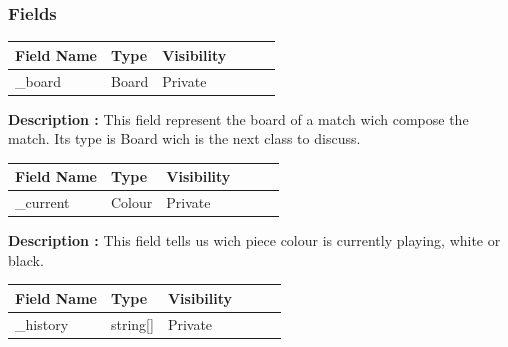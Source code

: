 \documentclass[12pt]{article}
\begin{document}
\subsubsection{Fields}

\begin{table}[H]
    \begin{tabular}{llllll}
    \hline
    \multicolumn{1}{|l|}{\cellcolor[HTML]{EFEFEF}\textbf{Field Name}} & \multicolumn{1}{l|}{\cellcolor[HTML]{EFEFEF}\textbf{Type}} & \multicolumn{1}{l|}{\cellcolor[HTML]{EFEFEF}\textbf{Visibility}} \\ \hline
    \multicolumn{1}{|l|}{\_board}                                     & \multicolumn{1}{l|}{Board}                                 & \multicolumn{1}{l|}{Private}                                     \\ \hline
    \end{tabular}
\end{table}

\textbf{Description :} This field represent the board of a match wich compose
the match. Its type is Board wich is the next class to discuss.

\begin{table}[H]
    \begin{tabular}{llllll}
    \hline
    \multicolumn{1}{|l|}{\cellcolor[HTML]{EFEFEF}\textbf{Field Name}} & \multicolumn{1}{l|}{\cellcolor[HTML]{EFEFEF}\textbf{Type}} & \multicolumn{1}{l|}{\cellcolor[HTML]{EFEFEF}\textbf{Visibility}} \\ \hline
    \multicolumn{1}{|l|}{\_current}                                     & \multicolumn{1}{l|}{Colour}                                 & \multicolumn{1}{l|}{Private}                                     \\ \hline
    \end{tabular}
\end{table}

\textbf{Description :} This field tells us wich piece colour is
currently playing, white or black.

\begin{table}[H]
    \begin{tabular}{llllll}
    \hline
    \multicolumn{1}{|l|}{\cellcolor[HTML]{EFEFEF}\textbf{Field Name}} & \multicolumn{1}{l|}{\cellcolor[HTML]{EFEFEF}\textbf{Type}} & \multicolumn{1}{l|}{\cellcolor[HTML]{EFEFEF}\textbf{Visibility}} \\ \hline
    \multicolumn{1}{|l|}{\_history}                                     & \multicolumn{1}{l|}{string[]}                            & \multicolumn{1}{l|}{Private}                                     \\ \hline
    \end{tabular}
\end{table}
\end{document}
